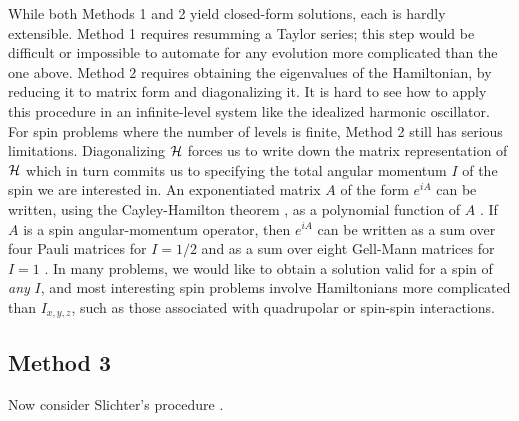 While both Methods 1 and 2 yield closed-form solutions, each is hardly extensible. 
Method 1 requires resumming a Taylor series; this step would be difficult or impossible to automate for any evolution more complicated than the one above.
Method 2 requires obtaining the eigenvalues of the Hamiltonian, by reducing it to matrix form and diagonalizing it.  
It is hard to see how to apply this procedure in an infinite-level system like the idealized harmonic oscillator.
For spin problems where the number of levels is finite, Method 2 still has serious limitations.
Diagonalizing ${\cal H}$ forces us to write down the matrix representation of ${\cal H}$ which in turn commits us to specifying the total angular momentum $I$ of the spin we are interested in.
An exponentiated matrix $A$ of the form $e^{i A}$ can be written, using the Cayley-Hamilton theorem \cite{Strang2016}, as a polynomial function of $A$ \cite{DeZela2014jun,Curtright2014aug}.
If $A$ is a spin angular-momentum operator, then $e^{i A}$ can be written as a sum over four Pauli matrices for $I = 1/2$ and as a sum over eight Gell-Mann matrices for $I = 1$ \cite{Gell-Mann1962feb,Bertlmann2008may,Curtright2015dec}.
In many problems, we would like to obtain a solution valid for a spin of \emph{any} $I$, and most interesting spin problems involve Hamiltonians more complicated than $I_{x, y, z}$, such as those associated with quadrupolar or spin-spin interactions.


\subsection{Method 3} 

Now consider Slichter's procedure \cite{Slichter1990}. 

